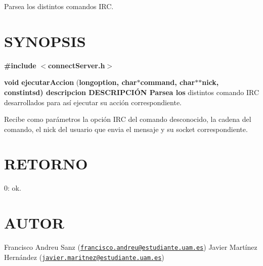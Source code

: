 Parsea los distintos comandos I\-R\-C.\hypertarget{unknown_case_SYNOPSIS}{}\section{S\-Y\-N\-O\-P\-S\-I\-S}\label{unknown_case_SYNOPSIS}
{\bfseries \#include} {\bfseries $<$connect\-Server.\-h$>$} 

{\bfseries void} {\bfseries ejecutar\-Accion} {\bfseries }({\bfseries long{\bfseries option{\bfseries },} {\bfseries char{\bfseries $\ast${\bfseries command{\bfseries },} {\bfseries char{\bfseries $\ast$$\ast${\bfseries nick{\bfseries },} const{\bfseries int{\bfseries sd{\bfseries })}  } } descripcion} D\-E\-S\-C\-R\-I\-P\-C\-IÓ\-N}  Parsea} los} distintos comando I\-R\-C desarrollados para así ejecutar su acción correspondiente.

Recibe como parámetros la opción I\-R\-C del comando desconocido, la cadena del comando, el nick del usuario que envia el mensaje y su socket correspondiente.\hypertarget{unknown_case_retorno}{}\section{R\-E\-T\-O\-R\-N\-O}\label{unknown_case_retorno}
0\-: ok.\hypertarget{unknown_case_authors}{}\section{A\-U\-T\-O\-R}\label{unknown_case_authors}
Francisco Andreu Sanz (\href{mailto:francisco.andreu@estudiante.uam.es}{\tt francisco.\-andreu@estudiante.\-uam.\-es}) Javier Martínez Hernández (\href{mailto:javier.maritnez@estudiante.uam.es}{\tt javier.\-maritnez@estudiante.\-uam.\-es}) 